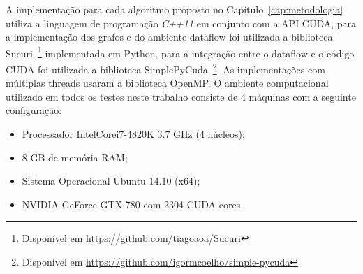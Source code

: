 A implementação para cada algoritmo proposto no Capítulo~\ref{cap:metodologia} utiliza a linguagem de programação \textit{C++11} em conjunto com a API CUDA\texttrademark, para a implementação dos grafos e do ambiente dataflow foi utilizada a biblioteca Sucuri~\cite{sucuri-original}\footnote{Disponível em \url{https://github.com/tiagoaoa/Sucuri}} implementada em Python, para a integração entre o dataflow e o código CUDA foi utilizada a biblioteca SimplePyCuda~\cite{simple-pycuda}\footnote{Disponível em \url{https://github.com/igormcoelho/simple-pycuda}}. As implementações com múltiplas threads usaram a biblioteca OpenMP.
O ambiente computacional utilizado em todos os testes neste trabalho consiste de 4 máquinas com a seguinte configuração:

\begin{itemize}
    \item Processador Intel\textregistered Core\texttrademark i7-4820K 3.7 GHz (4 núcleos);
    \item 8 GB de memória RAM;
    \item Sistema Operacional Ubuntu 14.10 (x64);
    \item NVIDIA GeForce GTX 780 com 2304 CUDA cores.
\end{itemize}

% 


